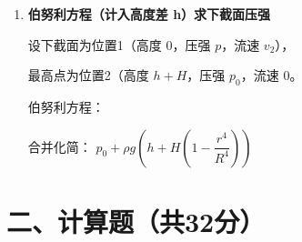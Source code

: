 \documentclass[11pt,a4paper]{article}
\begin{document}
\begin{enumerate}
\begin{enumerate}
    由 \( S_1 v_1 = S_2 v_2 \)：
    \[
    v_2 = \frac{r^2}{R^2} \sqrt{2gH}
    \]

     \item \textbf{伯努利方程（计入高度差 h）求下截面压强}
    
     设下截面为位置1（高度 \( 0 \)，压强 \( p \)，流速 \( v_2 \)），
    
     最高点为位置2（高度 \( h+H \)，压强 \( p_0 \)，流速 0。
    
     伯努利方程：

    合并化简：
     \( p_0 + \rho g \left( h + H\left(1 - \dfrac{r^4}{R^4}\right) \right) \)

\end{enumerate}
\end{enumerate}

\section*{二、计算题（共32分）}
\end{document}
